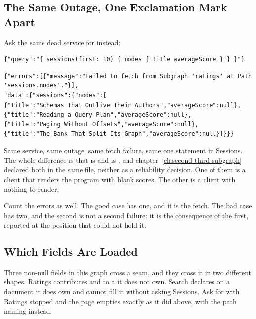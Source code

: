 \subsection{The Same Outage, One Exclamation Mark Apart}

%
Ask the same dead service for  instead:

\begin{verbatim}
{"query":"{ sessions(first: 10) { nodes { title averageScore } } }"}
\end{verbatim}

\begin{verbatim}
{"errors":[{"message":"Failed to fetch from Subgraph 'ratings' at Path 'sessions.nodes'."}],
"data":{"sessions":{"nodes":[
{"title":"Schemas That Outlive Their Authors","averageScore":null},
{"title":"Reading a Query Plan","averageScore":null},
{"title":"Paging Without Offsets","averageScore":null},
{"title":"The Bank That Split Its Graph","averageScore":null}]}}}
\end{verbatim}

%
Same service, same outage, same fetch failure, same one statement in Sessions.
The whole difference is that  is  and
 is , and chapter~\ref{ch:second-third-subgraph}
declared both in the same file, neither as a reliability decision. One of them
is a client that renders the program with blank scores. The other is a client
with nothing to render.

%
Count the errors as well. The good case has one, and it is the fetch. The bad
case has two, and the second is not a second failure: it is the consequence of
the first, reported at the position that could not hold it.

\subsection{Which Fields Are Loaded}

%
Three non-null fields in this graph cross a seam, and they cross it in two
different shapes. Ratings contributes  and
 to a  it does not own. Search declares
 on a document it does own and cannot fill it without asking
Sessions. Ask for  with Ratings stopped and the page empties
exactly as it did above, with the path naming  instead.


